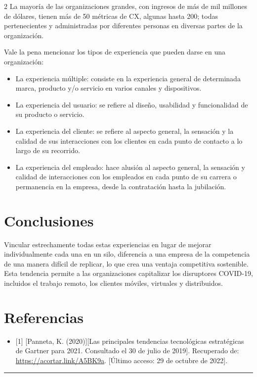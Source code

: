 \documentclass[12pt,spanish,Letterpaper,openany]{book}
\providecommand{\tightlist}{%
  \setlength{\itemsep}{0pt}\setlength{\parskip}{0pt}}
\newcommand{\HRule}{\begin{center}\rule{0.5\linewidth}{0.2mm}\end{center}}
\begin{document}
\begin {multicols}{2}
La mayoría de las organizaciones grandes, con ingresos de más de mil millones de dólares, tienen más de 50 métricas de CX, algunas hasta 200; todas pertenecientes y administradas por diferentes personas en diversas partes de la organización.

Vale la pena mencionar los tipos de experiencia que pueden darse en una organización:

\begin{itemize}
\tightlist
\item
  La experiencia múltiple: consiste en la experiencia general de determinada marca, producto y/o servicio en varios canales y dispositivos.
\item
  La experiencia del usuario: se refiere al diseño, usabilidad y funcionalidad de su producto o servicio.
\item
  La experiencia del cliente: se refiere al aspecto general, la sensación y la calidad de sus interacciones con los clientes en cada punto de contacto a lo largo de su recorrido.
\item
  La experiencia del empleado: hace alusión al aspecto general, la sensación y calidad de interacciones con los empleados en cada punto de su carrera o permanencia en la empresa, desde la contratación hasta la jubilación.
\end{itemize}

\hypertarget{conclusiones-3}{%
\section{Conclusiones}\label{conclusiones-3}}

Vincular estrechamente todas estas experiencias en lugar de mejorar individualmente cada una en un silo, diferencia a una empresa de la competencia de una manera difícil de replicar, lo que crea una ventaja competitiva sostenible. Esta tendencia permite a las organizaciones capitalizar los disruptores COVID-19, incluidos el trabajo remoto, los clientes móviles, virtuales y distribuidos.

\hypertarget{referencias-2}{%
\section{Referencias}\label{referencias-2}}

\begin{itemize}
\tightlist
\item
  {[}1{]} {[}Panneta, K. (2020){]}{[}Las principales tendencias tecnológicas estratégicas de Gartner para 2021. Consultado el 30 de julio de 2019{]}. Recuperado de: \url{https://acortar.link/A5BK9a}. {[}Último acceso: 29 de octubre de 2022{]}.
\end{itemize}

\end {multicols}
\medskip
\HRule
\medskip
\end{document}
